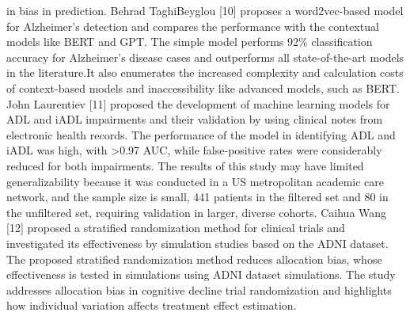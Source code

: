 \documentclass[conference]{IEEEtran} %
\begin{document}
in bias in prediction. Behrad TaghiBeyglou [10] proposes a word2vec-based model for Alzheimer's detection and compares the performance with the contextual models like BERT and GPT. The simple model performs 92\% classification accuracy for Alzheimer's disease cases and outperforms all state-of-the-art models in the literature.It also enumerates the increased complexity and calculation costs of context-based models and inaccessibility like advanced models, such as BERT. John Laurentiev [11] proposed the development of machine learning models for ADL and iADL impairments and their validation by using clinical notes from electronic health records. The performance of the model in identifying ADL and iADL was high, with >0.97 AUC, while false-positive rates were considerably reduced for both impairments. The results of this study may have limited generalizability because it was conducted in a US metropolitan academic care network, and the sample size is small, 441 patients in the filtered set and 80 in the unfiltered set, requiring validation in larger, diverse cohorts. Caihua Wang [12] proposed a stratified randomization method for clinical trials and investigated its effectiveness by simulation studies based on the ADNI dataset. The proposed stratified randomization method reduces allocation bias, whose effectiveness is tested in simulations using ADNI dataset simulations. The study addresses allocation bias in cognitive decline trial randomization and highlights how individual variation affects treatment effect estimation.
\end{document}
